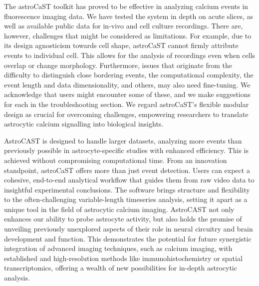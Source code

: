 The astroCaST toolkit has proved to be effective in analyzing calcium events in fluorescence imaging data. We have tested the system in depth on acute slices, as well as available public data for in-vivo and cell culture recordings. There are, however, challenges that might be considered as limitations. For example, due to its design agnosticism towards cell shape, astroCaST cannot firmly attribute events to individual cell. This allows for the analysis of recordings even when cells overlap or change morphology. Furthermore, issues that originate from the difficulty to distinguish close bordering events, the computational complexity, the event length and data dimensionality, and others, may also need fine-tuning. We acknowledge that users might encounter some of these, and we make suggestions for each in the troubleshooting section. We regard astroCaST's flexible modular design as crucial for overcoming challenges, empowering researchers to translate astrocytic calcium signalling into biological insights.

AstroCAST is designed to handle larger datasets, analyzing more events than previously possible in astrocyte-specific studies with enhanced efficiency. This is achieved without compromising computational time. From an innovation standpoint, astroCaST offers more than just event detection. Users can expect a cohesive, end-to-end analytical workflow that guides them from raw video data to insightful experimental conclusions. The software brings structure and flexibility to the often-challenging variable-length timeseries analysis, setting it apart as a unique tool in the field of astrocytic calcium imaging. AstroCAST not only enhances our ability to probe astrocyte activity, but also holds the promise of unveiling previously unexplored aspects of their role in neural circuitry and brain development and function. This demonstrates the potential for future synergistic integration of advanced imaging techniques, such as calcium imaging, with established and high-resolution methods like immunohistochemistry or spatial transcriptomics, offering a wealth of new possibilities for in-depth astrocytic analysis.
